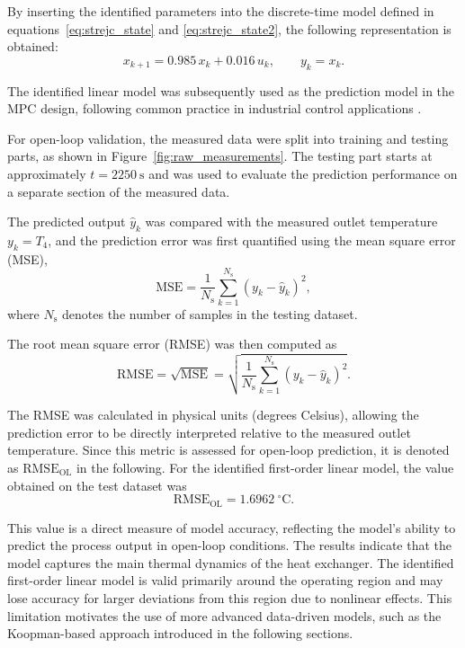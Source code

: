 By inserting the identified parameters into the discrete-time model defined in equations~\eqref{eq:strejc_state} and \eqref{eq:strejc_state2}, the following representation is obtained:
\begin{equation}
x_{k+1} = 0.985\,x_k + 0.016\,u_k,
\qquad
y_k = x_k.
\label{eq:strejc_discrete_model}
\end{equation}

The identified linear model was subsequently used as the prediction model in the MPC design, following common practice in industrial control applications \cite{rawlings_mpc}.


For open-loop validation, the measured data were split into training and testing parts, as shown in Figure~\ref{fig:raw_measurements}. The testing part starts at approximately $t = 2250~\mathrm{s}$ and was used to evaluate the prediction performance on a separate section of the measured data.

The predicted output $\hat{y}_k$ was compared with the measured outlet temperature $y_k = T_4$, and the prediction error was first quantified using the mean square error (MSE),
\begin{equation}
\mathrm{MSE} =
\frac{1}{N_{\mathrm{s}}} \sum_{k=1}^{N_{\mathrm{s}}}
\left( y_k - \hat{y}_k \right)^2,
\label{eq:mse}
\end{equation}
where $N_{\mathrm{s}}$ denotes the number of samples in the testing dataset.

The root mean square error (RMSE) was then computed as
\begin{equation}
\mathrm{RMSE} =
\sqrt{\mathrm{MSE}}
=
\sqrt{\frac{1}{N_{\mathrm{s}}} \sum_{k=1}^{N_{\mathrm{s}}}
\left( y_k - \hat{y}_k \right)^2}.
\label{eq:rmse}
\end{equation}


The RMSE was calculated in physical units (degrees Celsius), allowing the prediction error to be directly interpreted relative to the measured outlet temperature. Since this metric is assessed for open-loop prediction, it is denoted as $\mathrm{RMSE}_{\mathrm{OL}}$ in the following. For the identified first-order linear model, the value obtained on the test dataset was
\begin{equation}
\mathrm{RMSE}_{\mathrm{OL}} = 1.6962~^{\circ}\mathrm{C}.
\label{eq:rmseOL}
\end{equation}

This value is a direct measure of model accuracy, reflecting the model's ability to predict the process output in open-loop conditions. The results indicate that the model captures the main thermal dynamics of the heat exchanger. The identified first-order linear model is valid primarily around the operating region and may lose accuracy for larger deviations from this region due to nonlinear effects.
This limitation motivates the use of more advanced data-driven models, such as the Koopman-based approach introduced in the following sections.

